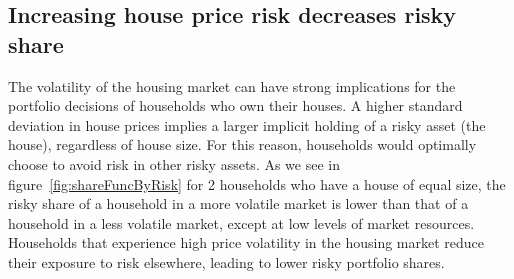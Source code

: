 
  \subsection{Increasing house price risk decreases risky share}

  \renewcommand{\figName}{shareFuncByRisk}
  \renewcommand{\figFile}{\figName}

  The volatility of the housing market can have strong implications for the portfolio decisions of households who own their houses. A higher standard deviation in house prices implies a larger implicit holding of a risky asset (the house), regardless of house size. For this reason, households would optimally choose to avoid risk in other risky assets. As we see in  figure~\ref{fig:shareFuncByRisk} for 2 households who have a house of equal size, the risky share of a household in a more volatile market is lower than that of a household in a less volatile market, except at low levels of market resources. Households that experience high price volatility in the housing market reduce their exposure to risk elsewhere, leading to lower risky portfolio shares.

